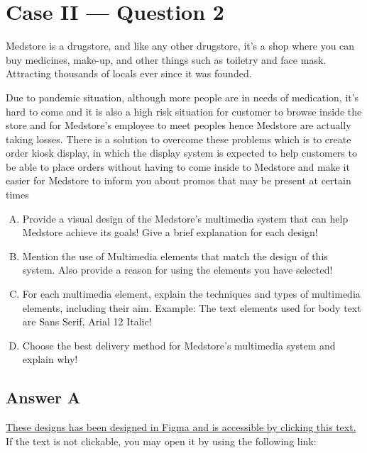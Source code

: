 \documentclass[
  11pt, %
]{assignment}
\begin{document}
\section*{Case II — Question 2}
\begin{problem}
Medstore\texttrademark{} is a drugstore, and like any other drugstore, it's a shop where you can buy medicines, make-up, and other things such as toiletry and face mask. Attracting thousands of locals ever since it was founded.

Due to pandemic situation, although more people are in needs of medication, it's hard to come and it is also a high risk situation for customer to browse inside the store and for Medstore's employee to meet peoples hence Medstore\texttrademark{} are actually taking losses. There is a solution to overcome these problems which is to create order kiosk display, in which the display system is expected to help customers to be able to place orders without having to come inside to Medstore\texttrademark{} and make it easier for Medstore\texttrademark{} to inform you about promos that may be present at certain times

\medskip

\begin{enumerate}[A.]
      \item Provide a visual design of the Medstore\texttrademark{}'s multimedia system that can help Medstore\texttrademark{} achieve its goals! Give a brief explanation for each design!
      \item Mention the use of Multimedia elements that match the design of this system. Also provide a reason for using the elements you have selected!
      \item  For each multimedia element, explain the techniques and types of multimedia elements, including their aim. Example: The text elements used for body text are Sans Serif, Arial 12 Italic!
      \item  Choose the best delivery method for Medstore\texttrademark{}'s multimedia system and explain why!
\end{enumerate}
\end{problem}

\subsection*{Answer A}

\href{https://www.figma.com/file/89F7uBeav522DjhLz141Rd/Medstore?node-id=0\%3A1}{These designs has been designed in Figma and is accessible by clicking this text.} If the text is not clickable, you may open it by using the following link:
\end{document}
